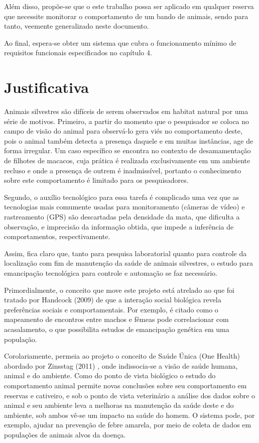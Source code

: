 Além disso, propõe-se que o este trabalho possa ser aplicado em qualquer reserva que necessite monitorar o comportamento de um bando de animais, sendo para tanto, veemente generalizado neste documento.

Ao final, espera-se obter um sistema que cubra o funcionamento mínimo de requisitos funcionais especificados no capítulo 4.

\section{Justificativa}
Animais silvestres são difíceis de serem observados em habitat natural por uma série de motivos. Primeiro, a partir do momento que o pesquisador se coloca no campo de visão do animal para observá-lo gera viés no comportamento deste, pois o animal também detecta a presença daquele e em muitas instâncias, age de forma irregular. Um caso específico se encontra no contexto de desamamentação de filhotes de macacos, cuja prática é realizada exclusivamente em um ambiente recluso e onde a presença de outrem é inadmissível, portanto o conhecimento sobre este comportamento é limitado para os pesquisadores.

Segundo, o auxílio tecnológico para essa tarefa é complicado uma vez que as tecnologias mais comumente usadas para monitoramento (câmeras de vídeo)  e rastreamento (GPS) são descartadas pela densidade da mata, que dificulta a observação, e imprecisão da informação obtida, que impede a inferência de comportamentos, respectivamente.

Assim, fica claro que, tanto para pesquisa laboratorial quanto para controle da localização com fim de manutenção da saúde de animais silvestres, o estudo para emancipação tecnológica para controle e automação se faz necessário.

Primordialmente, o conceito que move este projeto está atrelado ao que foi tratado por Handcock (2009) \cite{handcock} de que a interação social biológica revela preferências sociais e comportamentais. Por exemplo, é citado como o mapeamento de encontros entre machos e fêmeas pode correlacionar com acasalamento, o que possibilita estudos de emancipação genética em uma população.

Corolariamente, permeia ao projeto o conceito de Saúde Única (One Health) abordado por Zinsstag (2011) \cite{zinsstag}, onde indissocia-se a visão de saúde humana, animal e do ambiente. Como do ponto de vista biológico o estudo do comportamento animal permite novas conclusões sobre seu comportamento em reservas e cativeiro, e sob o ponto de vista veterinário a análise dos dados sobre o animal e seu ambiente leva a melhoras na manutenção da saúde deste e do ambiente, sob ambos vê-se um impacto na saúde do homem. O sistema pode, por exemplo, ajudar na prevenção de febre amarela, por meio de coleta de dados em populações de animais alvos da doença.

